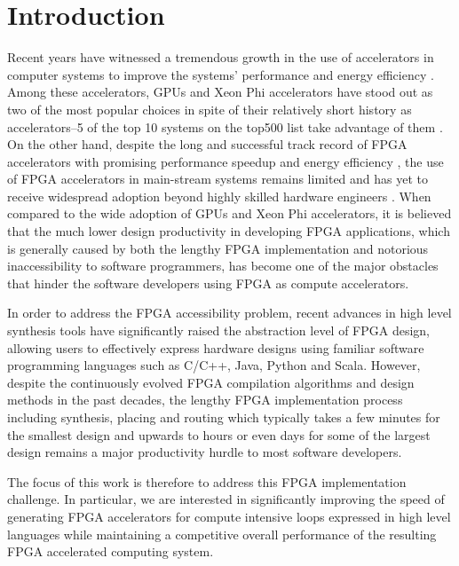 \section{Introduction}\label{sec:introduction}
Recent years have witnessed a tremendous growth in the use of accelerators in computer systems to improve the systems' performance and energy efficiency \cite{kim2014compression, majumder2014hardware, iouliia2004reconfigurable, souradip2010hardware, putnam2014reconfigurable}. Among these accelerators, GPUs and Xeon Phi accelerators have stood out as two of the most popular choices in spite of their relatively short history as accelerators--5 of the top 10 systems on the top500 list take advantage of them \cite{top500}. On the other hand, despite the long and successful track record of FPGA accelerators with promising performance speedup and energy efficiency \cite{iouliia2004reconfigurable, souradip2010hardware, asano2009performance, che2008accelerating, thomas2009comparison}, the use of FPGA accelerators in main-stream systems remains limited and has yet to receive widespread adoption beyond highly skilled hardware engineers \cite{cong2011high}. When compared to the wide adoption of GPUs and Xeon Phi accelerators, it is believed that the much lower design productivity in developing FPGA applications, which is generally caused by both the lengthy FPGA implementation and notorious inaccessibility to software programmers, has become one of the major obstacles that hinder the software developers using FPGA as compute accelerators. 

In order to address the FPGA accessibility problem, recent advances in high level synthesis tools have significantly raised the abstraction level of FPGA design, allowing users to effectively express hardware designs using familiar software programming languages such as C/C++, Java, Python and Scala. However, despite the continuously evolved FPGA compilation algorithms and design methods in the past decades, the lengthy FPGA implementation process including synthesis, placing and routing which typically takes a few minutes for the smallest design and upwards to hours or even days for some of the largest design remains a major productivity hurdle to most software developers. 

The focus of this work is therefore to address this FPGA implementation challenge. In particular, we are interested in significantly improving the speed of generating FPGA accelerators for compute intensive loops expressed in high level languages while maintaining a competitive overall performance of the resulting FPGA accelerated computing system.

